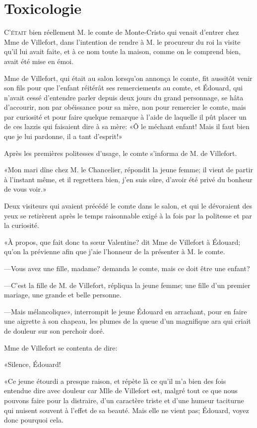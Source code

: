 \chapter{Toxicologie} 

\lettrine{C}{'était} bien réellement M. le comte de Monte-Cristo qui venait d'entrer chez Mme de Villefort, dans l'intention de rendre à M. le procureur du roi la visite qu'il lui avait faite, et à ce nom toute la maison, comme on le comprend bien, avait été mise en émoi. 

Mme de Villefort, qui était au salon lorsqu'on annonça le comte, fit aussitôt venir son fils pour que l'enfant réitérât ses remerciements au comte, et Édouard, qui n'avait cessé d'entendre parler depuis deux jours du grand personnage, se hâta d'accourir, non par obéissance pour sa mère, non pour remercier le comte, mais par curiosité et pour faire quelque remarque à l'aide de laquelle il pût placer un de ces lazzis qui faisaient dire à sa mère: «Ô le méchant enfant! Mais il faut bien que je lui pardonne, il a tant d'esprit!» 

Après les premières politesses d'usage, le comte s'informa de M. de Villefort. 

«Mon mari dîne chez M. le Chancelier, répondit la jeune femme; il vient de partir à l'instant même, et il regrettera bien, j'en suis sûre, d'avoir été privé du bonheur de vous voir.» 

Deux visiteurs qui avaient précédé le comte dans le salon, et qui le dévoraient des yeux se retirèrent après le temps raisonnable exigé à la fois par la politesse et par la curiosité.  

«À propos, que fait donc ta sœur Valentine? dit Mme de Villefort à Édouard; qu'on la prévienne afin que j'aie l'honneur de la présenter à M. le comte. 

—Vous avez une fille, madame? demanda le comte, mais ce doit être une enfant? 

—C'est la fille de M. de Villefort, répliqua la jeune femme; une fille d'un premier mariage, une grande et belle personne. 

—Mais mélancolique», interrompit le jeune Édouard en arrachant, pour en faire une aigrette à son chapeau, les plumes de la queue d'un magnifique ara qui criait de douleur sur son perchoir doré. 

Mme de Villefort se contenta de dire: 

«Silence, Édouard! 

«Ce jeune étourdi a presque raison, et répète là ce qu'il m'a bien des fois entendue dire avec douleur car Mlle de Villefort est, malgré tout ce que nous pouvons faire pour la distraire, d'un caractère triste et d'une humeur taciturne qui nuisent souvent à l'effet de sa beauté. Mais elle ne vient pas; Édouard, voyez donc pourquoi cela. 

